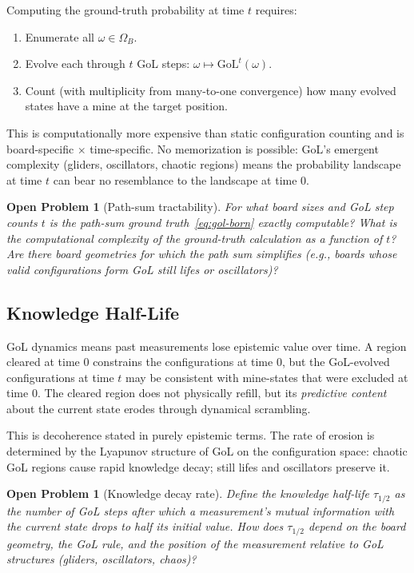 \documentclass[12pt,a4paper]{article}
\newtheorem{openproblem}[theorem]{Open Problem}
\theoremstyle{definition}
\theoremstyle{remark}
\newcommand{\Conf}{\Omega}
\newcommand{\GoL}{\mathrm{GoL}}
\begin{document}
Computing the ground-truth probability at time $t$ requires:
\begin{enumerate}[nosep]
  \item Enumerate all $\omega \in \Conf_B$.
  \item Evolve each through $t$ GoL steps: $\omega \mapsto \GoL^t(\omega)$.
  \item Count (with multiplicity from many-to-one convergence) how many evolved states have a mine at the target position.
\end{enumerate}

This is computationally more expensive than static configuration counting and is board-specific $\times$ time-specific.  No memorization is possible: GoL's emergent complexity (gliders, oscillators, chaotic regions) means the probability landscape at time $t$ can bear no resemblance to the landscape at time $0$.

\begin{openproblem}[Path-sum tractability]
\label{op:path-sum}
For what board sizes and GoL step counts $t$ is the path-sum ground truth~\eqref{eq:gol-born} exactly computable?  What is the computational complexity of the ground-truth calculation as a function of $t$?  Are there board geometries for which the path sum simplifies (e.g., boards whose valid configurations form GoL still lifes or oscillators)?
\end{openproblem}

\subsection{Knowledge Half-Life}
\label{sec:half-life}

GoL dynamics means past measurements lose epistemic value over time.  A region cleared at time $0$ constrains the configurations at time $0$, but the GoL-evolved configurations at time $t$ may be consistent with mine-states that were excluded at time $0$.  The cleared region does not physically refill, but its \emph{predictive content} about the current state erodes through dynamical scrambling.

This is decoherence stated in purely epistemic terms.  The rate of erosion is determined by the Lyapunov structure of GoL on the configuration space: chaotic GoL regions cause rapid knowledge decay; still lifes and oscillators preserve it.

\begin{openproblem}[Knowledge decay rate]
\label{op:decay}
Define the knowledge half-life $\tau_{1/2}$ as the number of GoL steps after which a measurement's mutual information with the current state drops to half its initial value.  How does $\tau_{1/2}$ depend on the board geometry, the GoL rule, and the position of the measurement relative to GoL structures (gliders, oscillators, chaos)?
\end{openproblem}
\end{document}
